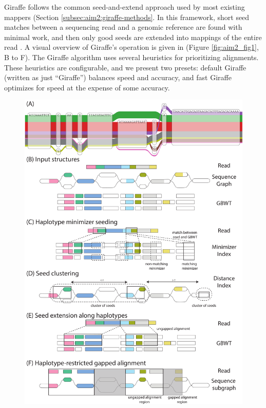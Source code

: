 \documentclass[11pt]{ucscthesis}
\begin{document}
Giraffe follows the common seed-and-extend approach used by most existing mappers (Section \ref{subsec:aim2:giraffe-methods}.
In this framework, short seed matches between a sequencing read and a genomic reference are found with minimal work, and then only good seeds are extended into mappings of the entire read \cite{langmead_bowtie2_2012,li_bwa_mem_2013,li_minimap2_2018}.
A visual overview of Giraffe’s operation is given in (Figure \ref{fig:aim2_fig1}, B to F).
The Giraffe algorithm uses several heuristics for prioritizing alignments.
These heuristics are configurable, and we present two presets: default Giraffe (written as just “Giraffe”) balances speed and accuracy, and fast Giraffe optimizes for speed at the expense of some accuracy.
\begin{figure}
    \centering
    \includegraphics[width=.5\linewidth]{aim2_fig1.pdf}

\end{figure}
\end{document}
